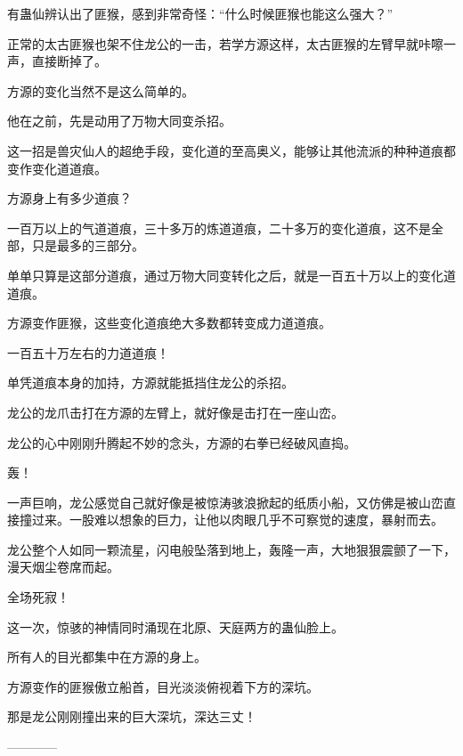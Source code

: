 \begin{this_body}
有蛊仙辨认出了匪猴，感到非常奇怪：“什么时候匪猴也能这么强大？”

正常的太古匪猴也架不住龙公的一击，若学方源这样，太古匪猴的左臂早就咔嚓一声，直接断掉了。

方源的变化当然不是这么简单的。

他在之前，先是动用了万物大同变杀招。

这一招是兽灾仙人的超绝手段，变化道的至高奥义，能够让其他流派的种种道痕都变作变化道道痕。

方源身上有多少道痕？

一百万以上的气道道痕，三十多万的炼道道痕，二十多万的变化道痕，这不是全部，只是最多的三部分。

单单只算是这部分道痕，通过万物大同变转化之后，就是一百五十万以上的变化道道痕。

方源变作匪猴，这些变化道痕绝大多数都转变成力道道痕。

一百五十万左右的力道道痕！

单凭道痕本身的加持，方源就能抵挡住龙公的杀招。

龙公的龙爪击打在方源的左臂上，就好像是击打在一座山峦。

龙公的心中刚刚升腾起不妙的念头，方源的右拳已经破风直捣。

轰！

一声巨响，龙公感觉自己就好像是被惊涛骇浪掀起的纸质小船，又仿佛是被山峦直接撞过来。一股难以想象的巨力，让他以肉眼几乎不可察觉的速度，暴射而去。

龙公整个人如同一颗流星，闪电般坠落到地上，轰隆一声，大地狠狠震颤了一下，漫天烟尘卷席而起。

全场死寂！

这一次，惊骇的神情同时涌现在北原、天庭两方的蛊仙脸上。

所有人的目光都集中在方源的身上。

方源变作的匪猴傲立船首，目光淡淡俯视着下方的深坑。

那是龙公刚刚撞出来的巨大深坑，深达三丈！

------------

\end{this_body}

